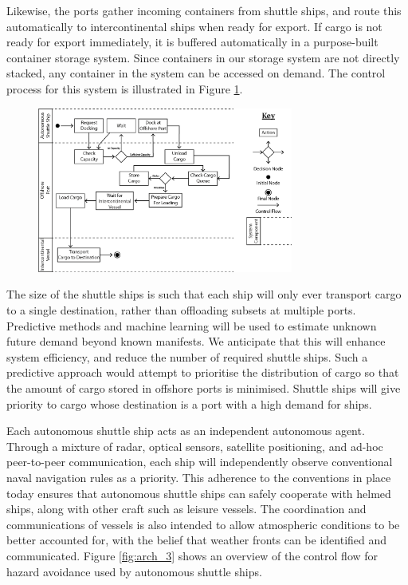 Likewise, the ports gather incoming containers from shuttle ships, and route this automatically to intercontinental ships when ready for export. If cargo is not ready for export immediately, it is buffered automatically in a purpose-built container storage system. Since containers in our storage system are not directly stacked, any container in the system can be accessed on demand. The control process for this system is illustrated in Figure \ref{fig:arch_2}.

\begin{figure}[h!]
\centering
	\includegraphics[width=0.75\textwidth]{images/arch_2}
	\caption{}
	\label{fig:arch_2}
\end{figure}

The size of the shuttle ships is such that each ship will only ever transport cargo to a single destination, rather than offloading subsets at multiple ports. Predictive methods and machine learning will be used to estimate unknown future demand beyond known manifests. We anticipate that this will enhance system efficiency, and reduce the number of required shuttle ships. Such a predictive approach would attempt to prioritise the distribution of cargo so that the amount of cargo stored in offshore ports is minimised. Shuttle ships will give priority to cargo whose destination is a port with a high demand for ships.

Each autonomous shuttle ship acts as an independent autonomous agent. Through a mixture of radar, optical sensors, satellite positioning, and ad-hoc peer-to-peer communication, each ship will independently observe conventional naval navigation rules as a priority. This adherence to the conventions in place today ensures that autonomous shuttle ships can safely cooperate with helmed ships, along with other craft such as leisure vessels. The coordination and communications of vessels is also intended to allow atmospheric conditions to be better accounted for, with the belief that weather fronts can be identified and communicated. Figure \ref{fig:arch_3} shows an overview of the control flow for hazard avoidance used by autonomous shuttle ships.

